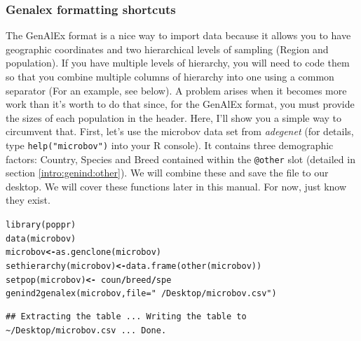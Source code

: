 \documentclass[letterpaper]{article}\usepackage[]{graphicx}\usepackage[]{color}
\makeatletter
\newcommand{\hlstr}[1]{\textcolor[rgb]{0.651,0.522,0}{#1}}%
\newcommand{\hlopt}[1]{\textcolor[rgb]{1,0,0.502}{\textbf{#1}}}%
\newcommand{\hlstd}[1]{\textcolor[rgb]{0,0,0}{#1}}%
\newcommand{\hlkwb}[1]{\textcolor[rgb]{0.502,0.502,0.753}{\textbf{#1}}}%
\newcommand{\hlkwc}[1]{\textcolor[rgb]{0,0.502,0.753}{#1}}%
\newcommand{\hlkwd}[1]{\textcolor[rgb]{0,0.267,0.4}{#1}}%
\newenvironment{kframe}{%
 \def\at@end@of@kframe{}%
 \ifinner\ifhmode%
  \def\at@end@of@kframe{\end{minipage}}%
  \begin{minipage}{\columnwidth}%
 \fi\fi%
 \def\FrameCommand##1{\hskip\@totalleftmargin \hskip-\fboxsep
 \colorbox{shadecolor}{##1}\hskip-\fboxsep
     \hskip-\linewidth \hskip-\@totalleftmargin \hskip\columnwidth}%
 \MakeFramed {\advance\hsize-\width
   \@totalleftmargin\z@ \linewidth\hsize
   \@setminipage}}%
 {\par\unskip\endMakeFramed%
 \at@end@of@kframe}
\newenvironment{knitrout}{}{} %
\newcommand{\tab}{\hspace*{1em}}
\makeatother
\begin{document}
\subsubsection{Genalex formatting shortcuts}\label{intro:import:genalex.short}

\tab\tab The GenAlEx format is a nice way to import data because it allows you to have geographic coordinates and two hierarchical levels of sampling (Region and population). If you have multiple levels of hierarchy, you will need to code them so that you combine multiple columns of hierarchy into one using a common separator (For an example, see below). A problem arises when it becomes more work than it's worth to do that since, for the GenAlEx format, you must provide the sizes of each population in the header. Here, I'll show you a simple way to circumvent that. First, let's use the microbov data set from \textit{adegenet} (for details, type \texttt{help("microbov")} into your R console). It contains three demographic factors: Country, Species and Breed contained within the \texttt{@other} slot (detailed in section \ref{intro:genind:other}). We will combine these and save the file to our desktop. We will cover these functions later in this manual. For now, just know they exist.

\begin{knitrout}\footnotesize
{}\color{fgcolor}\begin{kframe}
\begin{alltt}
\hlkwd{library}\hlstd{(poppr)}
\hlkwd{data}\hlstd{(microbov)}
\hlstd{microbov} \hlkwb{<-} \hlkwd{as.genclone}\hlstd{(microbov)}
\hlkwd{sethierarchy}\hlstd{(microbov)} \hlkwb{<-} \hlkwd{data.frame}\hlstd{(}\hlkwd{other}\hlstd{(microbov))}
\hlkwd{setpop}\hlstd{(microbov)} \hlkwb{<-} \hlopt{~}\hlstd{coun}\hlopt{/}\hlstd{breed}\hlopt{/}\hlstd{spe}
\hlkwd{genind2genalex}\hlstd{(microbov,} \hlkwc{file} \hlstd{=} \hlstr{"~/Desktop/microbov.csv"}\hlstd{)}
\end{alltt}
\end{kframe}
\end{knitrout}

\begin{knitrout}\footnotesize
{}\color{fgcolor}\begin{kframe}
\begin{verbatim}
## Extracting the table ... Writing the table to ~/Desktop/microbov.csv ... Done.
\end{verbatim}
\end{kframe}
\end{knitrout}
\end{document}
